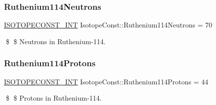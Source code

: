 \subsubsection{\texorpdfstring{Ruthenium114\+Neutrons}{Ruthenium114Neutrons}}
{\footnotesize\ttfamily \mbox{\hyperlink{group___isotope_const-_macros_ga5f18360b3e99483a35c32d789e62621c}{I\+S\+O\+T\+O\+P\+E\+C\+O\+N\+S\+T\+\_\+\+I\+NT}} Isotope\+Const\+::\+Ruthenium114\+Neutrons = 70}

\$ \$ Neutrons in Ruthenium-\/114. \mbox{\label{group___isotope_const-_ruthenium-_ru114_ga63284d914c1c7cfc9794f7a429f7e0f5}} 
\subsubsection{\texorpdfstring{Ruthenium114\+Protons}{Ruthenium114Protons}}
{\footnotesize\ttfamily \mbox{\hyperlink{group___isotope_const-_macros_ga5f18360b3e99483a35c32d789e62621c}{I\+S\+O\+T\+O\+P\+E\+C\+O\+N\+S\+T\+\_\+\+I\+NT}} Isotope\+Const\+::\+Ruthenium114\+Protons = 44}

\$ \$ Protons in Ruthenium-\/114. 